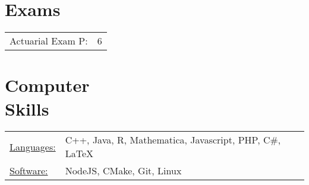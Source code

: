 \documentclass[margin]{res}
\begin{document}
\begin{resume}
\section{Exams}
\begin{tabular}{l p{3in}}
Actuarial Exam P: & 6
\end{tabular}


\section{Computer \\ Skills}
\begin{tabular}{l p{3in}}
\underline{Languages:} & C++, Java, R, Mathematica, 
Javascript, PHP, C\#, \LaTeX \\
\underline{Software:} &  NodeJS, CMake, Git, Linux
\end{tabular}

\end{resume} 
\end{document}
